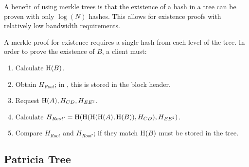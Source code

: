 \begin{figure}
\end{figure}

A benefit of using merkle trees is that the existence of a hash in a tree can be proven with only $\log(N)$ hashes.
This allows for existence proofs with relatively low bandwidth requirements.

A merkle proof for existence requires a single hash from each level of the tree.
In order to prove the existence of $B$, a client must:
\begin{enumerate}
	\item{Calculate $\operatorname{H}(B)$.}
	\item{Obtain $H_{Root}$; in \codename, this is stored in the block header.}
	\item{Request $\operatorname{H}(A), H_{CD}, H_{EE^2}$.}
	\item{Calculate $H_{Root'} = \operatorname{H}(\operatorname{H}(\operatorname{H}(\operatorname{H}(A), \operatorname{H}(B)), H_{CD}), H_{EE^2})$.}
	\item{Compare $H_{Root}$ and $H_{Root'}$; if they match $\operatorname{H}(B)$ must be stored in the tree.}
\end{enumerate}

\subsection{Patricia Tree}
\label{sec:trees:patricia}

